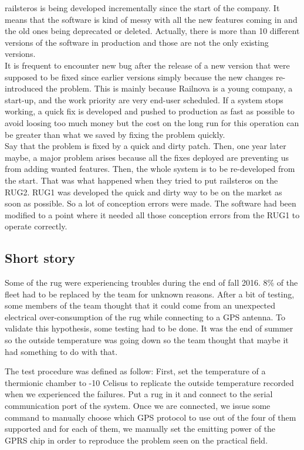\documentclass[12pt]{article}
\theoremstyle{definition}
\theoremstyle{definition}
\theoremstyle{remark}
\begin{document}
\gls{railsteros} is being developed incrementally since the start of the company. It means that the software is kind of messy with all the new features coming in and the old ones being deprecated or deleted. Actually, there is more than 10 different versions of the software in production and those are not the only existing versions.\\

It is frequent to encounter new bug after the release of a new version that were supposed to be fixed since earlier versions simply because the new changes re-introduced the problem. This is mainly because Railnova is a young company, a start-up, and the work priority are very end-user scheduled. If a system stops working, a quick fix is developed and pushed to production as fast as possible to avoid loosing too much money but the cost on the long run for this operation can be greater than what we saved by fixing the problem quickly.\\

Say that the problem is fixed by a quick and dirty patch. Then, one year later maybe, a major problem arises because all the fixes deployed are preventing us from adding wanted features. Then, the whole system is to be re-developed from the start. That was what happened when they tried to put \gls{railsteros} on the RUG2. RUG1 was developed the quick and dirty way to be on the market as soon as possible. So a lot of conception errors were made. The software had been modified to a point where it needed all those conception errors from the RUG1 to operate correctly.


\subsection{Short story}

Some of the \gls{rug} were experiencing troubles during the end of fall 2016. 8\% of the fleet had to be replaced by the team for unknown reasons. After a bit of testing, some members of the team thought that it could come from an unexpected electrical over-consumption of the \gls{rug} while connecting to a GPS antenna. To validate this hypothesis, some testing had to be done. It was the end of summer so the outside temperature was going down so the team thought that maybe it had something to do with that.

The test procedure was defined as follow: First, set the temperature of a thermionic chamber to -10 Celisus to replicate the outside temperature recorded when we experienced the failures. Put a \gls{rug} in it and connect to the serial communication port of the system. Once we are connected, we issue some command to manually choose which GPS protocol to use out of the four of them supported and for each of them, we manually set the emitting power of the GPRS chip in order to reproduce the problem seen on the practical field.\\
\end{document}

